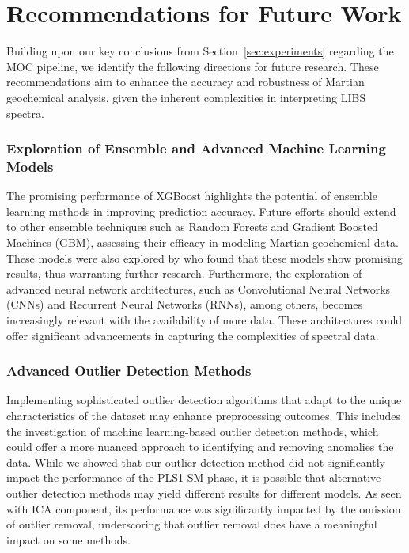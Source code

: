 \section{Recommendations for Future Work}\label{sec:recommendations_for_future_work}
Building upon our key conclusions from Section~\ref{sec:experiments} regarding the MOC pipeline, we identify the following directions for future research.
These recommendations aim to enhance the accuracy and robustness of Martian geochemical analysis, given the inherent complexities in interpreting LIBS spectra.

\subsubsection*{Exploration of Ensemble and Advanced Machine Learning Models} The promising performance of XGBoost highlights the potential of ensemble learning methods in improving prediction accuracy. 
Future efforts should extend to other ensemble techniques such as Random Forests and Gradient Boosted Machines (GBM), assessing their efficacy in modeling Martian geochemical data.
These models were also explored by \citet{andersonPostlandingMajorElement2022} who found that these models show promising results, thus warranting further research.
Furthermore, the exploration of advanced neural network architectures, such as Convolutional Neural Networks (CNNs) and Recurrent Neural Networks (RNNs), among others, becomes increasingly relevant with the availability of more data.
These architectures could offer significant advancements in capturing the complexities of spectral data.

\subsubsection*{Advanced Outlier Detection Methods} Implementing sophisticated outlier detection algorithms that adapt to the unique characteristics of the dataset may enhance preprocessing outcomes.
This includes the investigation of machine learning-based outlier detection methods, which could offer a more nuanced approach to identifying and removing anomalies the data.
While we showed that our outlier detection method did not significantly impact the performance of the PLS1-SM phase, it is possible that alternative outlier detection methods may yield different results for different models.
As seen with ICA component, its performance was significantly impacted by the omission of outlier removal, underscoring that outlier removal does have a meaningful impact on some methods.

